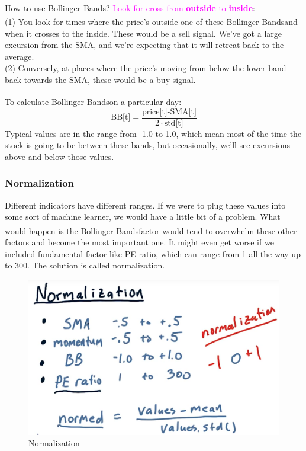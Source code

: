 \documentclass[12pt]{article}
\begin{document}
\noindent
How to use Bollinger Bands\textsuperscript\textregistered? \textcolor{magenta}{Look for cross from \textbf{outside} to \textbf{inside}}: \\
(1) You look for times where the price's outside one of these Bollinger Bands\textsuperscript\textregistered and when it crosses to the inside. These would be a sell signal. We've got a large excursion from the SMA, and we're expecting that it will retreat back to the average. \\
(2) Conversely, at places where the price's moving from below the lower band back towards the SMA, these would be a buy signal. 

To calculate Bollinger Bands\textsuperscript\textregistered on a particular day: 
\begin{equation}
\text{BB[t]} = \frac{\text{price[t]-SMA[t]}}{2\cdot\text{std[t]}}
\end{equation}
Typical values are in the range from -1.0 to 1.0, which mean most of the time the stock is going to be between these bands, but occasionally, we'll see excursions above and below those values. 

\subsubsection{Normalization}

Different indicators have different ranges. If we were to plug these values into some sort of machine learner, we would have a little bit of a problem. What would happen is the Bollinger Bands\textsuperscript\textregistered  factor would tend to overwhelm these other factors and become the most important one. It might even get worse if we included fundamental factor like PE ratio, which can range from 1 all the way up to 300. The solution is called normalization. 

\begin{figure}[!ht]
\centering
\includegraphics[scale=0.35]{fig/fig49}
\caption{Normalization}
\end{figure}
\end{document}
